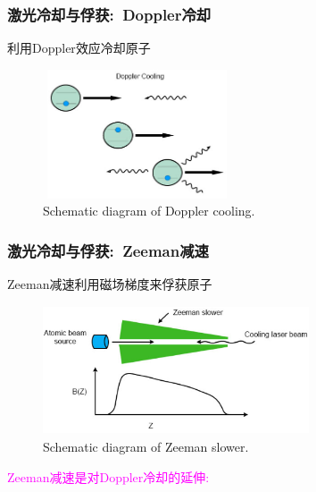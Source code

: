 \begin{frame}
    \frametitle{激光冷却与俘获:~\textrm{Doppler}冷却}
	    利用\textrm{Doppler}效应冷却原子
    \begin{figure}
        \centering
                \includegraphics[height=1.5in, width=2.2in, viewport=0 0 429 307,clip]{Figures/Atom-MOT-and-laser-cooling_Doppler_cooling.png}
		\caption{\tiny{\textrm{Schematic diagram of Doppler cooling.}}}
		\label{Fig:Atom-MOT-and-laser-cooling_Doppler_cooling}
    \end{figure}
	    {\fontsize{8.5pt}{5.2pt}\selectfont{将激光的频率调到略低于原子的跃迁频率:~
		    \begin{itemize}
			    \item 当激光束与原子相向运动，其频率略微蓝移，因此原子将吸收光子
		    \item 当原子与激光束背向运动，将感受到红移后的激光频率，而释放光子
		    \end{itemize}
	    最终使得原子损失动能，达到冷却的目的}}
\end{frame}

\begin{frame}
	\frametitle{激光冷却与俘获:~\textrm{Zeeman}减速}
	\textrm{Zeeman}减速利用磁场梯度来俘获原子
    \begin{figure}
        \centering
                \includegraphics[height=1.5in, width=3.1in, viewport=0 0 500 237,clip]{Figures/Atom-MOT-and-laser-cooling_Zeeman_slower.png}
		\caption{\tiny{\textrm{Schematic diagram of Zeeman slower.}}}
		\label{Fig:Atom-MOT-and-laser-cooling_Zeeman_slower}
    \end{figure}
	    \vskip -10pt
	    \textcolor{magenta}{\textrm{Zeeman}减速是对\textrm{Doppler}冷却的延伸:}\\
	{\fontsize{8.5pt}{5.2pt}}
\end{frame}

